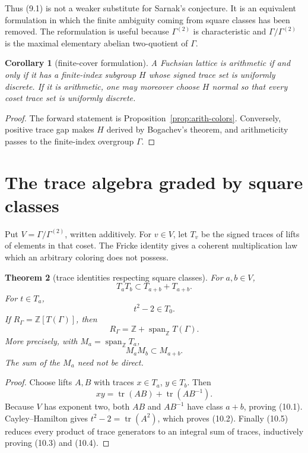 \documentclass[11pt,reqno]{amsart}
\newtheorem{theorem}{Theorem}[section]
\newtheorem{corollary}[theorem]{Corollary}
\theoremstyle{definition}
\theoremstyle{remark}
\newcommand{\Z}{\mathbb Z}
\newcommand{\Tr}{\operatorname{tr}}
\newcommand{\Span}{\operatorname{span}}
\begin{document}
Thus (9.1) is not a weaker substitute for Sarnak's conjecture.  It is an
equivalent formulation in which the finite ambiguity coming from square
classes has been removed.  The reformulation is useful because
\(\Gamma^{(2)}\) is characteristic and \(\Gamma/\Gamma^{(2)}\) is the
maximal elementary abelian two-quotient of \(\Gamma\).

\begin{corollary}[finite-cover formulation]
A Fuchsian lattice is arithmetic if and only if it has a finite-index subgroup
\(H\) whose signed trace set is uniformly discrete.  If it is arithmetic, one
may moreover choose \(H\) normal so that every coset trace set is uniformly
discrete.
\end{corollary}

\begin{proof}
The forward statement is Proposition~\ref{prop:arith-colors}.  Conversely,
positive trace gap makes \(H\) derived by Bogachev's theorem, and arithmeticity
passes to the finite-index overgroup \(\Gamma\).
\end{proof}

\section{The trace algebra graded by square classes}

Put \(V=\Gamma/\Gamma^{(2)}\), written additively.  For \(v\in V\), let
\(T_v\) be the signed traces of lifts of elements in that coset.  The Fricke
identity gives a coherent multiplication law which an arbitrary coloring does
not possess.

\begin{theorem}[trace identities respecting square classes]\label{thm:graded-trace}
For \(a,b\in V\),
\[
 T_aT_b\subset T_{a+b}+T_{a+b}.
\tag{10.1}
\]
For \(t\in T_a\),
\[
 t^2-2\in T_0.
\tag{10.2}
\]
If \(R_\Gamma=\Z[T(\Gamma)]\), then
\[
 R_\Gamma=\Z+\Span_\Z T(\Gamma).
\tag{10.3}
\]
More precisely, with \(M_a=\Span_\Z T_a\),
\[
 M_aM_b\subset M_{a+b}.
\tag{10.4}
\]
The sum of the \(M_a\) need not be direct.
\end{theorem}

\begin{proof}
Choose lifts \(A,B\) with traces \(x\in T_a\), \(y\in T_b\).  Then
\[
 xy=\Tr(AB)+\Tr(AB^{-1}).
\tag{10.5}
\]
Because \(V\) has exponent two, both \(AB\) and \(AB^{-1}\) have class
\(a+b\), proving (10.1).  Cayley--Hamilton gives
\(t^2-2=\Tr(A^2)\), which proves (10.2).  Finally (10.5) reduces every product
of trace generators to an integral sum of traces, inductively proving (10.3)
and (10.4).
\end{proof}
\end{document}
